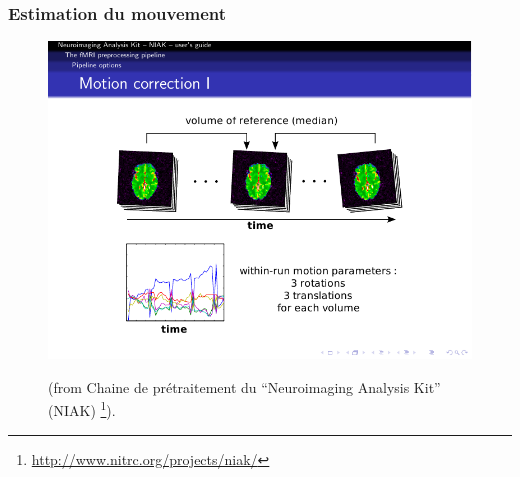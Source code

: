 \documentclass{beamer}
\begin{document}
\begin{frame}
\frametitle{Estimation du mouvement}
\begin{figure}
\begin{center}
\includegraphics[scale=0.9]{../figures/motion_estimation.pdf}
\end{center}
\tiny{%
(from Chaine de prétraitement du ``Neuroimaging Analysis Kit'' (NIAK) \footnote{\url{http://www.nitrc.org/projects/niak/}}).}
\label{fig_motion_estimation}
\end{figure}
\end{frame}
\end{document}
